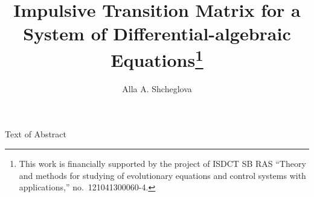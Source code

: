 \title{Impulsive Transition Matrix for a System of Differential-algebraic Equations\thanks{This work is financially supported by the project of ISDCT SB RAS ``Theory and methods for studying  of evolutionary equations and control systems with applications,'' no.~121041300060-4.}}
\author{Alla A. Shcheglova}


\maketitle

\begin{abstract}
\end{abstract}


Text of Abstract


\begin{thebibliography}{9}
\end{thebibliography}
